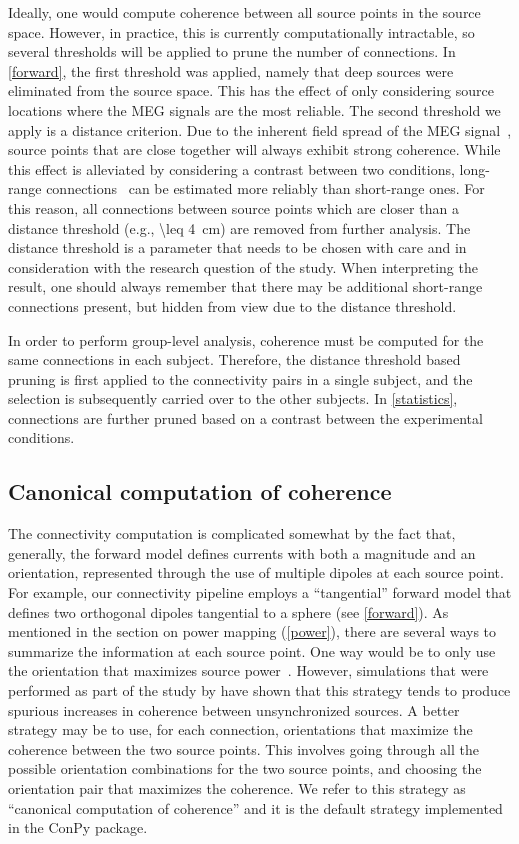 \documentclass[utf8]{frontiersSCNS}
\renewcommand{\cite}[1]{~\citep{#1}}
\newcommand{\textcite}[1]{\citet{#1}}
\begin{document}
Ideally, one would compute coherence between all source points in the source space.
However, in practice, this is currently computationally intractable, so several thresholds will be applied to prune the number of connections.
In \autoref{forward}, the first threshold was applied, namely that deep sources were eliminated from the source space.
This has the effect of only considering source locations where the MEG signals are the most reliable.
The second threshold we apply is a distance criterion.
Due to the inherent field spread of the MEG signal\cite{Hamalainen1993}, source points that are close together will always exhibit strong coherence.
While this effect is alleviated by considering a contrast between two conditions, long-range connections\cite{Salmelin2006} can be estimated more reliably than short-range ones.
For this reason, all connections between source points which are closer than a distance threshold (e.g., \SI{\leq 4}{\centi\meter}) are removed from further analysis.
The distance threshold is a parameter that needs to be chosen with care and in consideration with the research question of the study.
When interpreting the result, one should always remember that there may be additional short-range connections present, but hidden from view due to the distance threshold.

In order to perform group-level analysis, coherence must be computed for the same connections in each subject.
Therefore, the distance threshold based pruning is first applied to the connectivity pairs in a single subject, and the selection is subsequently carried over to the other subjects.
In \autoref{statistics}, connections are further pruned based on a contrast between the experimental conditions.

\subsection{Canonical computation of coherence}\label{canonical}

The connectivity computation is complicated somewhat by the fact that, generally, the forward model defines currents with both a magnitude and an orientation, represented through the use of multiple dipoles at each source point.
For example, our connectivity pipeline employs a ``tangential'' forward model that defines two orthogonal dipoles tangential to a sphere (see \autoref{forward}).
As mentioned in the section on power mapping (\autoref{power}), there are several ways to summarize the information at each source point.
One way would be to only use the orientation that maximizes source power\cite{Gross2001}.
However, simulations that were performed as part of the study by \textcite{Saarinen2015} have shown that this strategy tends to produce spurious increases in coherence between unsynchronized sources.
A better strategy may be to use, for each connection, orientations that maximize the coherence between the two source points.
This involves going through all the possible orientation combinations for the two source points, and choosing the orientation pair that maximizes the coherence.
We refer to this strategy as ``canonical computation of coherence'' and it is the default strategy implemented in the ConPy package.
\end{document}
